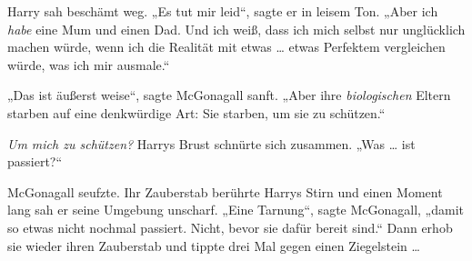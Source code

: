 Harry sah beschämt weg.
„Es tut mir leid“, sagte er in leisem Ton.
„Aber ich \emph{habe} eine Mum und einen Dad. Und ich weiß, dass ich mich selbst nur unglücklich machen würde, wenn ich die Realität mit etwas … etwas Perfektem vergleichen würde, was ich mir ausmale.“

„Das ist äußerst weise“, sagte McGonagall sanft.
„Aber ihre \emph{biologischen} Eltern starben auf eine denkwürdige Art: Sie starben, um sie zu schützen.“

\emph{Um mich zu schützen?} Harrys Brust schnürte sich zusammen.
„Was … ist passiert?“

McGonagall seufzte. Ihr Zauberstab berührte Harrys Stirn und einen Moment lang sah er seine Umgebung unscharf.
„Eine Tarnung“, sagte McGonagall, „damit so etwas nicht nochmal passiert. Nicht, bevor sie dafür bereit sind.“ Dann erhob sie wieder ihren Zauberstab und tippte drei Mal gegen einen Ziegelstein …

